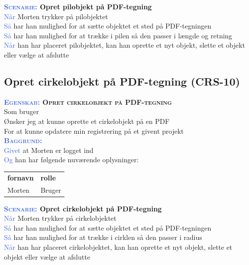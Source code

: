 \textbf{\textsc{\textcolor{RoyalBlue}{Scenarie:}} Opret pilobjekt på PDF-tegning}\\
\textcolor{RoyalBlue}{Når} Morten trykker på pilobjektet\\
\textcolor{RoyalBlue}{Så}  har han mulighed for at sætte objektet et sted på PDF-tegningen\\
\textcolor{RoyalBlue}{Så}  har han mulighed for at trække i pilen så den passer i længde og retning\\
\textcolor{RoyalBlue}{Når} han har placeret pilobjektet, kan han oprette et nyt objekt, slette et objekt eller vælge at afslutte \\

\subsection{Opret cirkelobjekt på PDF-tegning (CRS-10)} \label{sec:USOpretCirkelObjekt}
\textbf{\textsc{\textcolor{RoyalBlue}{Egenskab:} Opret cirkelobjekt på PDF-tegning}}\\
Som bruger\\
Ønsker jeg at kunne oprette et cirkelobjekt på en PDF\\
For at kunne opdatere min registrering på et givent projekt \\

\textsc{\textcolor{RoyalBlue}{\textbf{Baggrund:}}}\\
\textcolor{RoyalBlue}{Givet} at Morten er logget ind\\
\textcolor{RoyalBlue}{Og} han har følgende nuværende oplysninger:\\
\begin{tabular}{| l | l |}
	\textbf{fornavn} & \textbf{rolle} \\
	Morten & Bruger\\
\end{tabular}

\textbf{\textsc{\textcolor{RoyalBlue}{Scenarie:}} Opret cirkelobjekt på PDF-tegning}\\
\textcolor{RoyalBlue}{Når} Morten trykker på cirkelobjektet\\
\textcolor{RoyalBlue}{Så}  har han mulighed for at sætte objektet et sted på PDF-tegningen\\
\textcolor{RoyalBlue}{Så}  har han mulighed for at trække i cirklen så den passer i radius\\
\textcolor{RoyalBlue}{Når} han har placeret cirkelobjektet, kan han oprette et nyt objekt, slette et objekt eller vælge at afslutte \\

